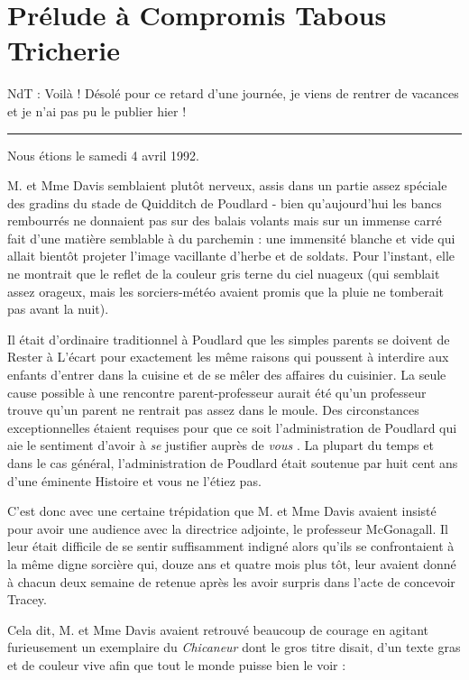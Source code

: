 
\chapter{Prélude à Compromis Tabous   Tricherie}

NdT : Voilà ! Désolé pour ce retard d'une journée, je viens de rentrer de vacances et je n'ai pas pu le publier hier !
\par\noindent\rule{\textwidth}{0.4pt}
Nous étions le samedi 4 avril 1992.

M. et Mme Davis semblaient plutôt nerveux, assis dans un partie assez spéciale des gradins du stade de Quidditch de Poudlard - bien qu'aujourd'hui les bancs rembourrés ne donnaient pas sur des balais volants mais sur un immense carré fait d'une matière semblable à du parchemin : une immensité blanche et vide qui allait bientôt projeter l'image vacillante d'herbe et de soldats. Pour l'instant, elle ne montrait que le reflet de la couleur gris terne du ciel nuageux (qui semblait assez orageux, mais les sorciers-météo avaient promis que la pluie ne tomberait pas avant la nuit).

Il était d'ordinaire traditionnel à Poudlard que les simples parents se doivent de Rester à L'écart pour exactement les même raisons qui poussent à interdire aux enfants d'entrer dans la cuisine et de se mêler des affaires du cuisinier. La seule cause possible à une rencontre parent-professeur aurait été qu'un professeur trouve qu'un parent ne rentrait pas assez dans le moule. Des circonstances exceptionnelles étaient requises pour que ce soit l'administration de Poudlard qui aie le sentiment d'avoir à \emph{se}  justifier auprès de \emph{vous} . La plupart du temps et dans le cas général, l'administration de Poudlard était soutenue par huit cent ans d'une éminente Histoire et vous ne l'étiez pas.

C'est donc avec une certaine trépidation que M. et Mme Davis avaient insisté pour avoir une audience avec la directrice adjointe, le professeur McGonagall. Il leur était difficile de se sentir suffisamment indigné alors qu'ils se confrontaient à la même digne sorcière qui, douze ans et quatre mois plus tôt, leur avaient donné à chacun deux semaine de retenue après les avoir surpris dans l'acte de concevoir Tracey.

Cela dit, M. et Mme Davis avaient retrouvé beaucoup de courage en agitant furieusement un exemplaire du \emph{Chicaneur}  dont le gros titre disait, d'un texte gras et de couleur vive afin que tout le monde puisse bien le voir :


